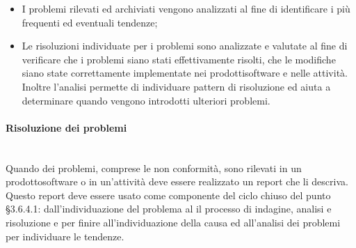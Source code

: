 \begin{itemize}
\begin{itemize}
\begin{itemize}
			\item \textbf{Conformità}: (software) per violazioni di conformità del prodotto\glo;
			\item \textbf{Validazione}: (software) per problemi riscontrati durante il processo\glosp di Validazione\glo.
		\end{itemize}
		\item \textbf{Priorità}: potrà essere:
		\begin{itemize}
			\item Bloccante;
			\item Urgente;
			\item Alta;
			\item Media;
			\item Bassa.
		\end{itemize}
		\item \textbf{Stato}: potrà essere:
		\begin{itemize}
			\item Da fare;
			\item In corso;
			\item Completato.
		\end{itemize}
	\end{itemize}
	\item I problemi rilevati ed archiviati vengono  analizzati al fine di identificare i più frequenti ed eventuali tendenze;
	\item Le risoluzioni individuate per i problemi sono analizzate e valutate al fine di verificare che i problemi siano stati effettivamente risolti, che le modifiche siano state correttamente implementate nei prodotti\glosp software e nelle attività. Inoltre l'analisi permette di individuare pattern di risoluzione ed aiuta a determinare quando vengono introdotti ulteriori problemi.			
\end{itemize}

\paragraph{Risoluzione dei problemi}\mbox{}\\ [1mm]
Quando dei problemi, comprese le non conformità, sono rilevati in un prodotto\glosp software o in un'attività deve essere realizzato un report che li descriva. Questo report deve essere usato come componente del ciclo chiuso del punto §3.6.4.1: dall'individuazione del problema al il processo di indagine, analisi e risoluzione e per finire all'individuazione della causa ed all'analisi dei problemi per individuare le tendenze.

